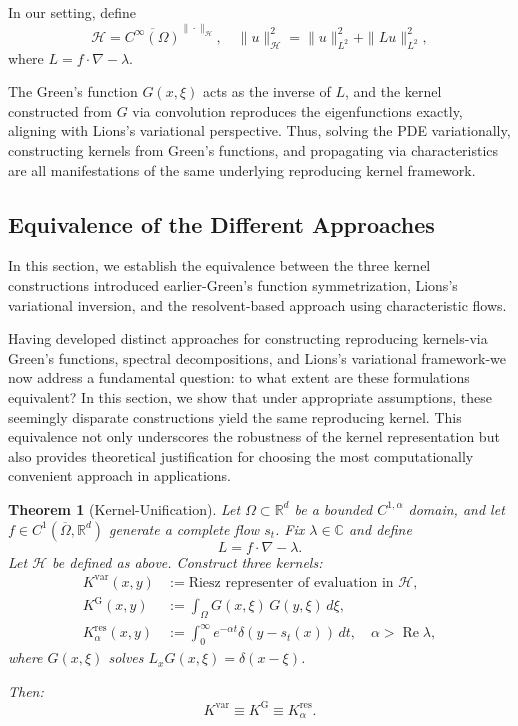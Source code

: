 \documentclass[11pt]{article}
\theoremstyle{plain}
\newtheorem{theorem}{Theorem}[section]
\def\[{\begin{equation}}
\def\]{\end{equation}}
\begin{document}
In our setting, define
\[
\mathcal{H} = \overline{C^\infty(\Omega)}^{\|\cdot\|_{\mathcal{H}}},\quad
\|u\|_{\mathcal{H}}^2 = \|u\|_{L^2}^2 + \|Lu\|_{L^2}^2,
\]
where \(L = f\cdot\nabla - \lambda\).

The Green's function \(G(x,\xi)\) acts as the inverse of \(L\), and the kernel constructed from \(G\) via convolution reproduces the eigenfunctions exactly, aligning with Lions’s variational perspective. Thus, solving the PDE variationally, constructing kernels from Green’s functions, and propagating via characteristics are all manifestations of the same underlying reproducing kernel framework.

\subsection{Equivalence of the Different Approaches}

In this section, we establish the equivalence between the three kernel constructions introduced earlier-Green’s function symmetrization, Lions’s variational inversion, and the resolvent-based approach using characteristic flows. 


Having developed distinct approaches for constructing reproducing kernels-via Green's functions, spectral decompositions, and Lions's variational framework-we now address a fundamental question: to what extent are these formulations equivalent? In this section, we show that under appropriate assumptions, these seemingly disparate constructions yield the same reproducing kernel. This equivalence not only underscores the robustness of the kernel representation but also provides theoretical justification for choosing the most computationally convenient approach in applications.  
 

\begin{theorem}[Kernel-Unification]
\label{thm:unification}
Let \(\Omega\subset\mathbb{R}^{d}\) be a bounded \(C^{1,\alpha}\) domain, and let \(f\in C^{1}(\overline\Omega,\mathbb{R}^{d})\) generate a complete flow \(s_t\). Fix \(\lambda\in\mathbb{C}\) and define
\[
L = f\cdot\nabla - \lambda.
\]
Let \(\mathcal{H}\) be defined as above. Construct three kernels:
\[
\begin{aligned}
K^{\mathrm{var}}(x,y) &:= \text{Riesz representer of evaluation in } \mathcal{H},\\
K^{\mathrm{G}}(x,y) &:= \int_\Omega G(x,\xi)\,G(y,\xi)\,d\xi,\\
K^{\mathrm{res}}_\alpha(x,y) &:= \int_0^\infty e^{-\alpha t} \delta(y-s_t(x))\,dt,\quad \alpha>\operatorname{Re}\lambda,
\end{aligned}
\]
where \(G(x,\xi)\) solves \(L_x G(x,\xi) = \delta(x-\xi)\).

Then:
\[
K^{\mathrm{var}} \equiv K^{\mathrm{G}} \equiv K^{\mathrm{res}}_\alpha.
\]
\end{theorem}
\end{document}
